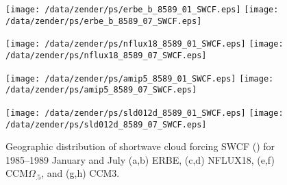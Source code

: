 \documentclass[twocolumn,final,11pt]{article}
\begin{document}
\setlength\abovecaptionskip{9pt}
\setlength\belowcaptionskip{9pt}

\setlength\floatsep{0pt}
\setlength\textfloatsep{0pt}
\setlength\dblfloatsep{0pt}
\setlength\dbltextfloatsep{0pt}
\setlength\intextsep{0pt}

\setcounter{page}{1}
\pagestyle{myheadings}
\thispagestyle{empty}
\onecolumn
\listoffigures
\twocolumn
{}
\setcounter{page}{1}


% 
%

\begin{figure*}
\begin{center}
\texttt{[image: /data/zender/ps/erbe\_b\_8589\_01\_SWCF.eps]}%
\texttt{[image: /data/zender/ps/erbe\_b\_8589\_07\_SWCF.eps]}%

\texttt{[image: /data/zender/ps/nflux18\_8589\_01\_SWCF.eps]}%
\texttt{[image: /data/zender/ps/nflux18\_8589\_07\_SWCF.eps]}%

\texttt{[image: /data/zender/ps/amip5\_8589\_01\_SWCF.eps]}%
\texttt{[image: /data/zender/ps/amip5\_8589\_07\_SWCF.eps]}%

\texttt{[image: /data/zender/ps/sld012d\_8589\_01\_SWCF.eps]}%
\texttt{[image: /data/zender/ps/sld012d\_8589\_07\_SWCF.eps]}%
\end{center}
\caption[Geographic distribution of shortwave cloud forcing SWCF
for 1985--1989 January and July ERBE, NFLUX18, CCM$\Omega_{.5}$, and CCM3]{
Geographic distribution of shortwave cloud forcing SWCF (\wxmS) for
1985--1989 January and July (a,b) ERBE, (c,d) NFLUX18, (e,f)
CCM$\Omega_{.5}$, and (g,h) CCM3.   
\label{fig:8589_SWCF}}   
\end{figure*}
\clearpage
\end{document}
